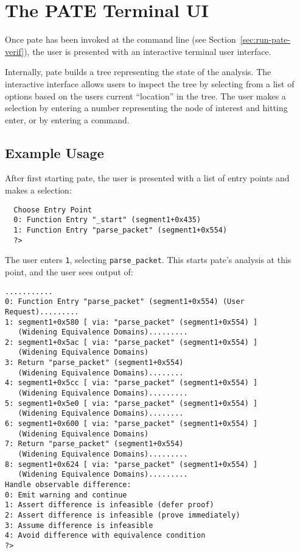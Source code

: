\section{The PATE Terminal UI}
\label{sec:terminal-ui}

Once pate has been invoked at the command line (see Section~\ref{sec:run-pate-verif}), the user is presented with an interactive terminal user interface.

Internally, pate builds a tree representing the state of the analysis.
The interactive interface allows users to inspect the tree by selecting from a list of options based on the users current ``location'' in the tree.
The user makes a selection by entering a number representing the node of interest and hitting enter, or by entering a command.

\subsection{Example Usage}

After first starting pate, the user is presented with a list of entry points and makes a selection:
\begin{verbatim}
  Choose Entry Point
  0: Function Entry "_start" (segment1+0x435)
  1: Function Entry "parse_packet" (segment1+0x554)
  ?>
\end{verbatim}

The user enters \texttt{1}, selecting \texttt{parse\_packet}.
This starts pate's analysis at this point, and the user sees output of:

\begin{verbatim}
...........
0: Function Entry "parse_packet" (segment1+0x554) (User Request).........
1: segment1+0x580 [ via: "parse_packet" (segment1+0x554) ]
   (Widening Equivalence Domains).........
2: segment1+0x5ac [ via: "parse_packet" (segment1+0x554) ]
   (Widening Equivalence Domains)
3: Return "parse_packet" (segment1+0x554)
   (Widening Equivalence Domains)........
4: segment1+0x5cc [ via: "parse_packet" (segment1+0x554) ]
   (Widening Equivalence Domains).........
5: segment1+0x5e0 [ via: "parse_packet" (segment1+0x554) ]
   (Widening Equivalence Domains)........
6: segment1+0x600 [ via: "parse_packet" (segment1+0x554) ]
   (Widening Equivalence Domains)
7: Return "parse_packet" (segment1+0x554)
   (Widening Equivalence Domains).........
8: segment1+0x624 [ via: "parse_packet" (segment1+0x554) ]
   (Widening Equivalence Domains).........
Handle observable difference:
0: Emit warning and continue
1: Assert difference is infeasible (defer proof)
2: Assert difference is infeasible (prove immediately)
3: Assume difference is infeasible
4: Avoid difference with equivalence condition
?>
\end{verbatim}

